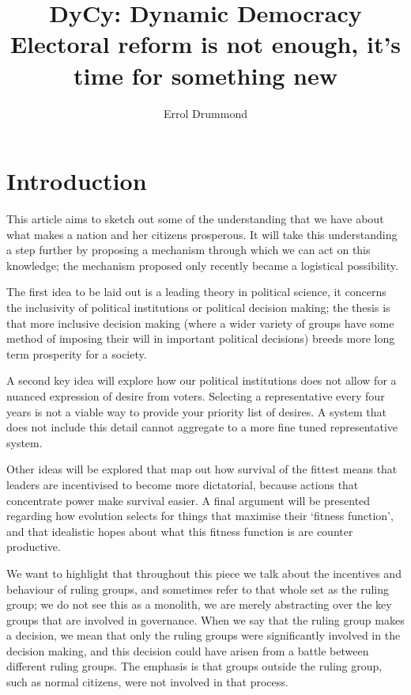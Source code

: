 \documentclass[twoside]{article}
\title{DyCy: Dynamic Democracy \\ \small Electoral reform is not enough, it’s time for something new}
\author{Errol Drummond}
\date{}
\begin{document}
	\maketitle

\section{Introduction}

This article aims to sketch out some of the understanding that we have about what makes a nation and her citizens prosperous. It will take this understanding a step further by proposing a mechanism through which we can act on this knowledge; the mechanism proposed only recently became a logistical possibility.

The first idea to be laid out is a leading theory in political science, it concerns the inclusivity of political institutions or political decision making; the thesis is that more inclusive decision making (where a wider variety of groups have some method of imposing their will in important political decisions) breeds more long term prosperity for a society. 

A second key idea will explore how our political institutions does not allow for a nuanced expression of desire from voters. Selecting a representative every four years is not a viable way to provide your priority list of desires. A system that does not include this detail cannot aggregate to a more fine tuned representative system.

Other ideas will be explored that map out how survival of the fittest means that leaders are incentivised to become more dictatorial, because actions that concentrate power make survival easier. A final argument will be presented regarding how evolution selects for things that maximise their ‘fitness function’, and that idealistic hopes about what this fitness function is are counter productive. 

We want to highlight that throughout this piece we talk about the incentives and behaviour of ruling groups, and sometimes refer to that whole set as the ruling group; we do not see this as a monolith, we are merely abstracting over the key groups that are involved in governance. When we say that the ruling group makes a decision, we mean that only the ruling groups were significantly involved in the decision making, and this decision could have arisen from a battle between different ruling groups. The emphasis is that groups outside the ruling group, such as normal citizens, were not involved in that process.
\end{document}
